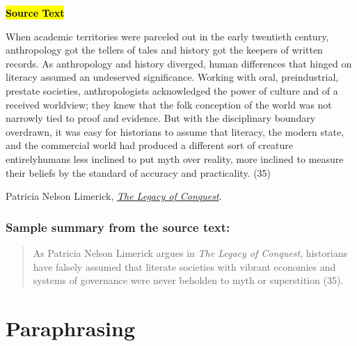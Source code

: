 \begin{tcolorbox}[enhanced,width=4.2in,left=.3in, right=.3in,
   drop fuzzy shadow southeast,
    boxrule=0.4pt,sharp corners,colframe=black!80!black,colback=white!10]

\medskip

{\small
\begin{doublespacing}
\textbf{\hl{Source Text}}
\smallskip

\hspace{.5cm}When academic territories were parceled out in the early twentieth century,
anthropology got the tellers of tales and history got the keepers of written
records. As anthropology and history diverged, human differences that
hinged on literacy assumed an undeserved significance. Working with oral,
preindustrial, prestate societies, anthropologists acknowledged the power
of culture and of a received worldview; they knew that the folk conception
of the world was not narrowly tied to proof and evidence.  But with the
disciplinary boundary overdrawn, it was easy for historians to assume that
literacy, the modern state, and the commercial world had produced a different
sort of creature entirely\textemdash humans less inclined to put myth over reality,
more inclined to measure their beliefs by the standard of accuracy and
practicality. (35)

\bigskip

\noindent\textemdash Patricia Nelson Limerick, \href{http://libcat.dartmouth.edu/record=b1422593~S1}{\emph{The Legacy of Conquest}}.

\bigskip

\end{doublespacing}}

\end{tcolorbox}

\subsubsection*{Sample summary from the source text:}

\begin{quote}
As Patricia Nelson Limerick argues in \emph{The Legacy of Conquest},
historians have falsely assumed that literate societies with vibrant economies and
systems of governance were never beholden to myth or superstition (35).
\end{quote}

\hypertarget{paraphrase}{}
\section{Paraphrasing}

